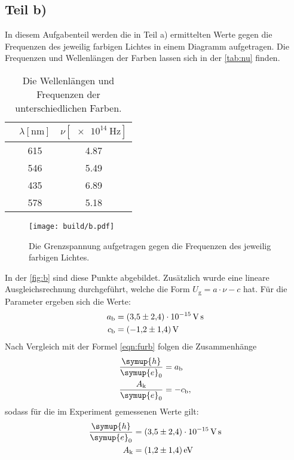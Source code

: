 \subsection{Teil b)}
In diesem Aufgabenteil werden die in Teil a) ermittelten Werte gegen die Frequenzen des jeweilig farbigen Lichtes in einem Diagramm aufgetragen. 
Die Frequenzen und Wellenlängen der Farben lassen sich in der \autoref{tab:nu} finden. 
\begin{table}
  \centering
  \caption{Die Wellenlängen und Frequenzen der unterschiedlichen Farben.}
  \label{tab:nu}
  \begin{tabular}{S[table-format=7] S[table-format=3] S[table-format=1.2]}
    \toprule
    & $\lambda [\si{\nano\metre}]$ & $\nu [\SI{e14}{\hertz}]$\\
    \midrule
        & 615 & 4.87\\
       & 546 & 5.49\\
     & 435 & 6.89\\
     & 578 & 5.18 \\
    \bottomrule
  \end{tabular}
\end{table}

\begin{figure}[H]
  \centering
  \texttt{[image: build/b.pdf]}
  \caption{Die Grenzspannung aufgetragen gegen die Frequenzen des jeweilig farbigen Lichtes.}
  \label{fig:b}
\end{figure}
\noindent
In der \autoref{fig:b} sind diese Punkte abgebildet. 
Zusätzlich wurde eine lineare Ausgleichsrechnung durchgeführt, welche die Form $U_{\text{g}} = a\cdot \nu - c$ hat.
Für die Parameter ergeben sich die Werte: 
\begin{align*}
  a_{\text{b}} &= \SI{3.5(24)e-15}{\volt\second}\\
  c_{\text{b}} &= \SI{-1.2 \pm 1.4}{\volt}
\end{align*}
Nach Vergleich mit der Formel \eqref{eqn:furb} folgen die Zusammenhänge
\begin{align*}
  \frac{\symup{h}}{\symup{e}_0} &= a_{\text{b}}\\
  \frac{A_{\text{k}}}{\symup{e}_0} &= - c_{\text{b}},
\end{align*}
sodass für die im Experiment gemessenen Werte gilt:
\begin{align*}
  \frac{\symup{h}}{\symup{e}_0} &= \SI{3.5(24)e-15}{\volt\second}\\
  A_{\text{k}} &= \SI{1.2 \pm 1.4}{\electronvolt}
\end{align*}

